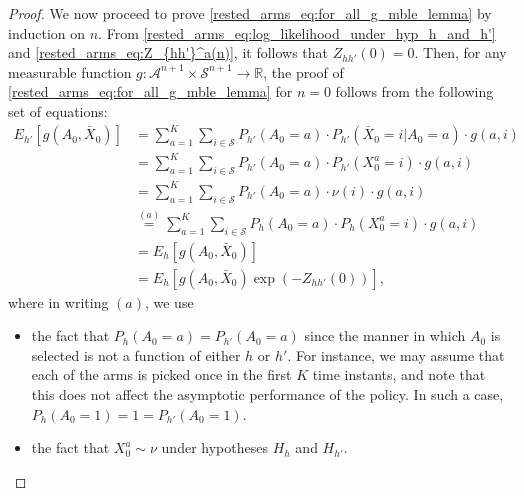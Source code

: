 \begin{proof}
We now proceed to prove \eqref{rested_arms_eq:for_all_g_mble_lemma} by induction on $n$.
From \eqref{rested_arms_eq:log_likelihood_under_hyp_h_and_h'} and  \eqref{rested_arms_eq:Z_{hh'}^a(n)}, it follows that $Z_{hh'}(0)=0$. Then, for any measurable function $g:\mathcal{A}^{n+1}\times \mathcal{S}^{n+1}\to\mathbb{R}$, the proof of \eqref{rested_arms_eq:for_all_g_mble_lemma} for $n=0$ follows from the following set of equations:
\begingroup\allowdisplaybreaks\begin{align}
	E_{h'}[g(A_0,\bar{X}_0)]
	&=\sum\limits_{a=1}^{K}\sum\limits_{i\in\mathcal{S}}P_{h'}(A_0=a)\cdot P_{h'}(\bar{X}_0=i|A_0=a)\cdot g(a,i)\nonumber\\
	&=\sum\limits_{a=1}^{K}\sum\limits_{i\in\mathcal{S}}P_{h'}(A_0=a)\cdot P_{h'}(X_0^a=i)\cdot g(a,i)\nonumber\\
	&=\sum\limits_{a=1}^{K}\sum\limits_{i\in\mathcal{S}}P_{h'}(A_0=a)\cdot \nu(i)\cdot g(a,i)\nonumber\\
	&\stackrel{(a)}{=}\sum\limits_{a=1}^{K}\sum\limits_{i\in\mathcal{S}}P_{h}(A_0=a)\cdot P_h(X_0^a=i)\cdot g(a,i)\nonumber\\
	&=E_h[g(A_0,\bar{X}_0)]\nonumber\\
	&=E_h[g(A_0,\bar{X}_0)\exp(-Z_{hh'}(0))],
\end{align}\endgroup
where in writing $(a)$, we use
\begin{itemize}
\item the fact that $P_h(A_0=a)=P_{h'}(A_0=a)$ since the manner in which $A_0$ is selected is not a function of either $h$ or $h'$. For instance, we may assume that each of the arms is picked once in the first $K$ time instants, and note that this does not affect the asymptotic performance of the policy. In such a case, $P_h(A_0=1)=1=P_{h'}(A_0=1)$.
\item the fact that $X_0^a\sim \nu$ under hypotheses $H_h$ and $H_{h'}$.
\end{itemize}


\end{proof}
